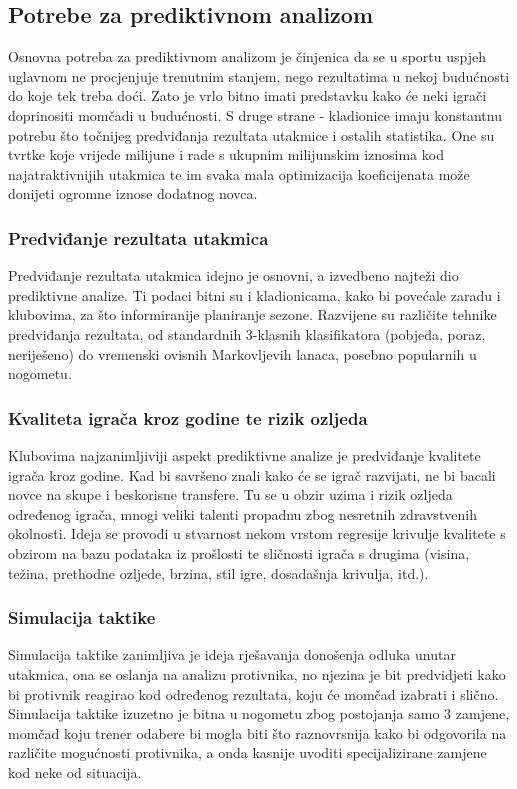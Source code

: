 \documentclass{ferseminar}
\begin{document}
\subsection{Potrebe za prediktivnom analizom}

Osnovna potreba za prediktivnom analizom je činjenica da se u sportu uspjeh uglavnom ne procjenjuje trenutnim stanjem, nego rezultatima u nekoj budućnosti do koje tek treba doći. Zato je vrlo bitno imati predstavku kako će neki igrači doprinositi momčadi u budućnosti.
\newline
S druge strane - kladionice imaju konstantnu potrebu što točnijeg predviđanja rezultata utakmice i ostalih statistika. One su tvrtke koje vrijede milijune i rade s ukupnim milijunskim iznosima kod najatraktivnijih utakmica te im svaka mala optimizacija koeficijenata može donijeti ogromne iznose dodatnog novca.

\subsubsection{Predviđanje rezultata utakmica}
Predviđanje rezultata utakmica idejno je osnovni, a izvedbeno najteži dio prediktivne analize. Ti podaci bitni su i kladionicama, kako bi povećale zaradu i klubovima, za što informiranije planiranje sezone. Razvijene su različite tehnike predviđanja rezultata, od standardnih 3-klasnih klasifikatora (pobjeda, poraz, neriješeno) do vremenski ovisnih Markovljevih lanaca, posebno popularnih u nogometu.\cite{pred}

\subsubsection{Kvaliteta igrača kroz godine te rizik ozljeda}
Klubovima najzanimljiviji aspekt prediktivne analize je predviđanje kvalitete igrača kroz godine. Kad bi savršeno znali kako će se igrač razvijati, ne bi bacali novce na skupe i beskorisne transfere. Tu se u obzir uzima i rizik ozljeda određenog igrača, mnogi veliki talenti propadnu zbog nesretnih zdravstvenih okolnosti. Ideja se provodi u stvarnost nekom vrstom regresije krivulje kvalitete s obzirom na bazu podataka iz prošlosti te sličnosti igrača s drugima (visina, težina, prethodne ozljede, brzina, stil igre, dosadašnja krivulja, itd.).\cite{tennis}

\subsubsection{Simulacija taktike}
Simulacija taktike zanimljiva je ideja rješavanja donošenja odluka unutar utakmica, ona se oslanja na analizu protivnika, no njezina je bit predvidjeti kako bi protivnik reagirao kod određenog rezultata, koju će momčad izabrati i slično. Simulacija taktike izuzetno je bitna u nogometu zbog postojanja samo 3 zamjene, momčad koju trener odabere bi mogla biti što raznovrsnija kako bi odgovorila na različite mogućnosti protivnika, a onda kasnije uvoditi specijalizirane zamjene kod neke od situacija.
\end{document}
